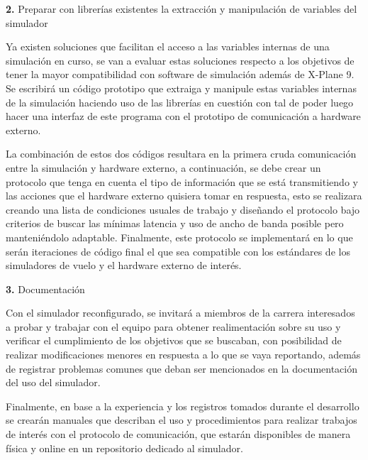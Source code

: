 \documentclass[12pt]{report}
\begin{document}
\noindent
\textbf{2.} Preparar con librerías existentes la extracción y manipulación de variables del simulador

Ya existen soluciones que facilitan el acceso a las variables internas de una simulación en curso, se van a evaluar estas soluciones respecto a los objetivos de tener la mayor compatibilidad con software de simulación además de X-Plane 9. Se escribirá un código prototipo que extraiga y manipule estas variables internas de la simulación haciendo uso de las librerías en cuestión con tal de poder luego hacer una interfaz de este programa con el prototipo de comunicación a hardware externo.

La combinación de estos dos códigos resultara en la primera cruda comunicación entre la simulación y hardware externo, a continuación, se debe crear un protocolo que tenga en cuenta el tipo de información que se está transmitiendo y las acciones que el hardware externo quisiera tomar en respuesta, esto se realizara creando una lista de condiciones usuales de trabajo y diseñando el protocolo bajo criterios de buscar las mínimas latencia y uso de ancho de banda posible pero manteniéndolo adaptable. Finalmente, este protocolo se implementará en lo que serán iteraciones de código final el que sea compatible con los estándares de los simuladores de vuelo y el hardware externo de interés.

\noindent
\textbf{3.} Documentación

Con el simulador reconfigurado, se invitará a miembros de la carrera interesados a probar y trabajar con el equipo para obtener realimentación sobre su uso y verificar el cumplimiento de los objetivos que se buscaban, con posibilidad de realizar modificaciones menores en respuesta a lo que se vaya reportando, además de registrar problemas comunes que deban ser mencionados en la documentación del uso del simulador.

Finalmente, en base a la experiencia y los registros tomados durante el desarrollo se crearán manuales que describan el uso y procedimientos para realizar trabajos de interés con el protocolo de comunicación, que estarán disponibles de manera física y online en un repositorio dedicado al simulador.
\end{document}
